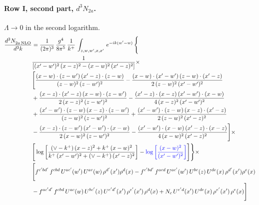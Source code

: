\documentclass[10pt]{article}
\numberwithin{equation}{section}
\newcommand{\new}[1]{{\color{blue}#1}}
\begin{document}
\paragraph{Row I, second part, $d^3N_{2a}$.}
$\Lambda\to0$ in the second logarithm.
\begin{align}
    \frac{d^{3}N_{2a\,\rm NLO}^{\rm}}{d^{3}k}  & =  \frac{1}{(2\pi)^{3}}\, \frac{g^{4}}{8\pi^{5}}\,\frac{1}{k^{+}}\,\int_{z,w,w^{\prime},x,x'}\, e^{-ik(w^{\prime}-w)}\, \Bigg\{\notag \\
& \frac{1}{\left[(x'-w')^{2}\, (x-z)^{2}-(x-w)^{2}\, (x'-z)^{2}\right]}\times\,\notag \\ & \Bigg[\frac{(x-w)\cdot (z-w')\, (x'-z)\cdot (z-w)}{(z-w)^{2}\,(z-w')^{2}}-\frac{(x-w)\cdot (x'-w')\, (z-w)\cdot (x'-z)}{2\, (z-w)^{2}\, (x'-w')^{2}}\notag \\ & + \frac{(x-z)\cdot (x'-z)\, (x-w)\cdot (z-w')}{2\, (x-z)^{2}\, (z-w')^{2}}-\frac{(x'-z)\cdot (x-z)\, (x'-w')\cdot (x-w)}{4\, (x-z)^{2}\, (x'-w')^{2}}\notag \\ & + \frac{(x'-w')\cdot (z-w)\, (x-z)\cdot (z-w')}{(z-w)^{2}\,(z-w')^{2}}+\frac{(x'-w')\cdot (z-w)\, (x-z)\cdot (x'-z)}{2\, (z-w)^{2}\, (x'-z)^{2}}\notag \\ & - \frac{(x-z)\cdot (z-w')\, (x'-w')\cdot (x-w)}{2\, (x-w)^{2}\, (z-w')^{2}} -\frac{(x'-w')\cdot (x-w)\, (x'-z)\cdot (x-z)}{4\, (x-w)^{2}\, (x'-z)^{2}}\Bigg]\times\notag \\ &  \Bigg[\log{\left[\frac{(\vee-k^{+})\,(x-z)^{2}+k^{+}\,(x-w)^{2}}{k^{+}\, (x'-w')^{2} + (\vee-k^{+})\, (x'-z)^{2}}\right]}-\new{\log{\left[\frac{(x-w)^{2}}{(x'-w')^{2}}\right]}}\Bigg]\Bigg\} \times\, \notag \\ & \Bigg[f^{c'bd'}\,f^{cbd}\, U^{ac'}(w')\,U^{ac}(w)\,\rho^{d'}(x')\rho^{d}(x)- f^{c'bd'}\,f^{acd}\,U^{ac'}(w')\,U^{bc}(z)\,U^{de}(x)\,\rho^{d'}(x')\rho^{e}(x) \notag \\ & -f^{ac'd'}\,f^{cbd}\,U^{ac}(w)\,U^{bc'}(z)\,U^{e'd'}(x')\,\rho^{e'}(x')\,\rho^{d}(x) +N_{c}\,U^{e'd}(x')\,U^{de}(x)\,\rho^{e'}(x')\,\rho^{e}(x)\Bigg] \label{eq:F:G2I2a}
\end{align}
\end{document}
